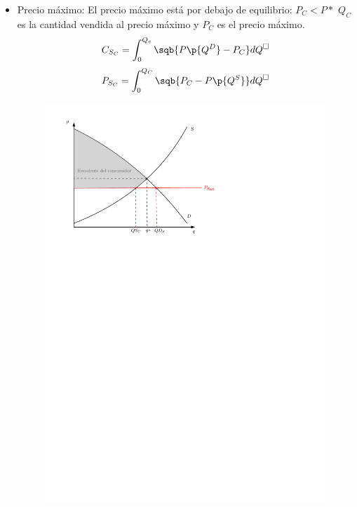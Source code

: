 \begin{itemize}
    \item Precio máximo: El precio máximo está por debajo de equilibrio: $\displaystyle P_C < P*$ $\displaystyle Q_C$ es la cantidad vendida al precio máximo y $\displaystyle P_C$ es el precio máximo. 
        \[
          C_{S_C} = \int_{0}^{Q_c}\sqb{P\p{Q^D} -P_C} dQ^{\square}
        \]
        \[
          P_{S_C} = \int_{0}^{Q_C} \sqb{P_C-P\p{Q^S} } dQ^{\square}
        \]
        \begin{figure}[!htb]
            \centering
            \includegraphics{Clases/figs/05}
        \end{figure}
    

\end{itemize}
